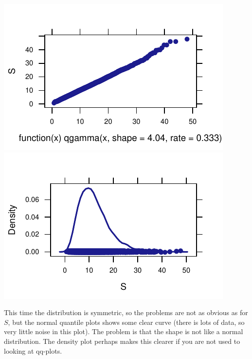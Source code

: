 \documentclass[twoside]{book}\usepackage[]{graphicx}\usepackage[]{xcolor}
\makeatletter
\def\maxwidth{ %
  \ifdim\Gin@nat@width>\linewidth
    \linewidth
  \else
    \Gin@nat@width
  \fi
}
\newenvironment{knitrout}{}{} %
\makeatother
\begin{document}
\begin{solution}
\begin{knitrout}
{\centering \includegraphics[width=\maxwidth]{figures/fig-unnamed-chunk-139-1} 
\includegraphics[width=\maxwidth]{figures/fig-unnamed-chunk-139-2} 

}



\end{knitrout}

This time the distribution is symmetric, so the problems are not as obvious as for $S$, but the 
normal quantile plots shows some clear curve (there is lots of data, so very little noise in
this plot).  The problem is that the shape is not like a normal distribution.  
The density plot perhaps makes this clearer if you are not used to looking at qq-plots.
\end{solution}

% 	
\end{document}
